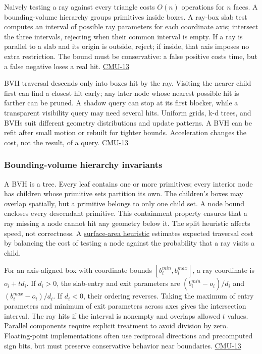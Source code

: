 Naively testing a ray against every triangle costs \(O(n)\) operations for \(n\) faces. A bounding-volume hierarchy groups primitives inside boxes. A ray-box slab test computes an interval of possible ray parameters for each coordinate axis; intersect the three intervals, rejecting when their common interval is empty. If a ray is parallel to a slab and its origin is outside, reject; if inside, that axis imposes no extra restriction. The bound must be conservative: a false positive costs time, but a false negative loses a real hit. \hyperref[04-visual-computing-ii-ch036]{CMU-13}

BVH traversal descends only into boxes hit by the ray. Visiting the nearer child first can find a closest hit early; any later node whose nearest possible hit is farther can be pruned. A shadow query can stop at its first blocker, while a transparent visibility query may need several hits. Uniform grids, k-d trees, and BVHs suit different geometry distributions and update patterns. A BVH can be refit after small motion or rebuilt for tighter bounds. Acceleration changes the cost, not the result, of a query. \hyperref[04-visual-computing-ii-ch036]{CMU-13}

\subsubsection{Bounding-volume hierarchy invariants}\label{bounding-volume-hierarchy-invariants}

A BVH is a tree. Every leaf contains one or more primitives; every interior node has children whose primitive sets partition its own. The children's boxes may overlap spatially, but a primitive belongs to only one child set. A node bound encloses every descendant primitive. This containment property ensures that a ray missing a node cannot hit any geometry below it. The split heuristic affects speed, not correctness. A \hyperref[appendix-0b426c47dd78]{surface-area heuristic} estimates expected traversal cost by balancing the cost of testing a node against the probability that a ray visits a child.

For an axis-aligned box with coordinate bounds \([b_i^{min},b_i^{max}]\), a ray coordinate is \(o_i+td_i\). If \(d_i>0\), the slab-entry and exit parameters are \((b_i^{min}-o_i)/d_i\) and \((b_i^{max}-o_i)/d_i\). If \(d_i<0\), their ordering reverses. Taking the maximum of entry parameters and minimum of exit parameters across axes gives the intersection interval. The ray hits if the interval is nonempty and overlaps allowed \(t\) values. Parallel components require explicit treatment to avoid division by zero. Floating-point implementations often use reciprocal directions and precomputed sign bits, but must preserve conservative behavior near boundaries. \hyperref[04-visual-computing-ii-ch036]{CMU-13}

